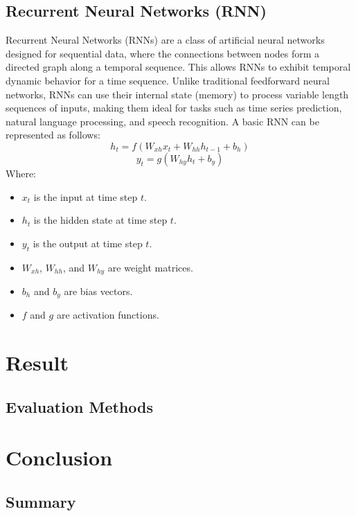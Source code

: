 \documentclass{ieeeojies}
\begin{document}
\subsection{Recurrent Neural Networks (RNN)}
Recurrent Neural Networks (RNNs) are a class of artificial neural networks designed for sequential data, where the connections between nodes form a directed graph along a temporal sequence. This allows RNNs to exhibit temporal dynamic behavior for a time sequence. Unlike traditional feedforward neural networks, RNNs can use their internal state (memory) to process variable length sequences of inputs, making them ideal for tasks such as time series prediction, natural language processing, and speech recognition.
A basic RNN can be represented as follows:
\begin{dmath*}
    h_t = f(W_{xh} x_t + W_{hh} h_{t-1} + b_h)
\end{dmath*}
\begin{dmath*}
    y_t = g(W_{hy} h_t + b_y)
\end{dmath*}
Where:\begin {itemize}
    \item \(x_t\) is the input at time step \(t\).
    \item \(h_t\) is the hidden state at time step \(t\).
    \item \(y_t\) is the output at time step \(t\).
    \item \(W_{xh}\), \(W_{hh}\), and \(W_{hy}\) are weight matrices.
    \item \(b_h\) and \(b_y\) are bias vectors.
    \item \(f\) and \(g\) are activation functions.
\end{itemize}


\section{Result}

\subsection{Evaluation Methods}

\section{Conclusion}

\subsection{Summary}
\end{document}
